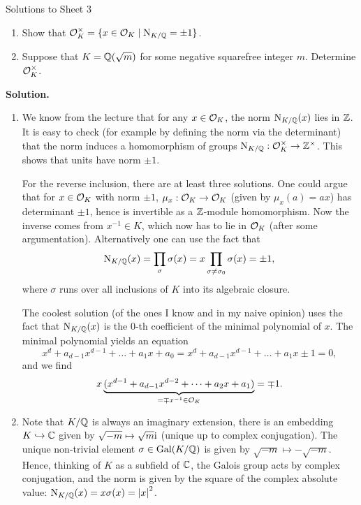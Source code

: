 \documentclass[a4paper,11pt]{article}
\begin{document}
\begin{center}
    \huge{Solutions to Sheet 3}
\end{center}

\begin{enumerate}
    \item Show that $\mathcal{O}_K^\times = \{x \in \mathcal{O}_K \mid \operatorname{N}_{K/\mathbb{Q}} = \pm 1\}$.
    \item Suppose that $K = \mathbb{Q}(\sqrt m)$ for some negative squarefree integer
        $m$. Determine $\mathcal{O}_K^\times$. 
\end{enumerate}

\textbf{Solution.}
\begin{enumerate}[wide, labelindent=0pt]
    \item We know from the lecture that for any $x \in \mathcal{O}_K$, the norm
        $\operatorname{N}_{K/\mathbb{Q}}(x)$ lies in $\mathbb{Z}$. It is easy to check (for example by 
        defining the norm via the determinant) that the norm induces a
        homomorphism of groups $\operatorname{N}_{K/\mathbb{Q}}: \mathcal{O}_K^\times \to \mathbb{Z}^\times$.
        This shows that units have norm $\pm 1$. 

        For the reverse inclusion, there are at least three solutions. 
        One could argue that for $x \in \mathcal{O}_K$ with norm $\pm 1$, $\mu_x: \mathcal{O}_K
        \to \mathcal{O}_K$ (given by $\mu_x(a) = ax$) has determinant $\pm 1$, hence is
        invertible as a $\mathbb{Z}$-module homomorphism. Now the inverse comes from
        $x^{-1} \in K$, which now has to lie in $\mathcal{O}_K$ (after some
        argumentation). Alternatively one can use the fact that $$\operatorname{N}_{K/\mathbb{Q}}(x) =
        \prod_\sigma \sigma(x) = x \prod_{\sigma \neq \sigma_0} \sigma(x) = \pm
        1,$$ where $\sigma$ runs over all inclusions of $K$ into its algebraic
        closure. 

        The coolest solution (of the ones I know and in my naive opinion) uses the fact that
        $\operatorname{N}_{K/\mathbb{Q}}(x)$ is the $0$-th coefficient of the minimal polynomial of
        $x$. The minimal polynomial yields an equation
        \begin{equation*}
            x^d + a_{d-1}x^{d-1} + \dots + a_1 x + a_0 = x^d + a_{d-1}x^{d-1} + \dots + a_1 x \pm 1 = 0,
        \end{equation*}
        and we find
        \begin{equation*}
            x\underbrace{(x^{d-1} + a_{d-1}x^{d-2} + \dots + a_2 x + a_1)}_{= \mp x^{-1} \in \mathcal{O}_K} = \mp 1.
        \end{equation*}
    \item 
        Note that $K/\mathbb{Q}$ is always an imaginary extension, there is an
        embedding $K \hookrightarrow \mathbb{C}$ given by 
        $\sqrt{-m} \mapsto \sqrt m \mathrm i$ (unique up to complex conjugation). 
        The unique non-trivial element $\sigma \in \operatorname{Gal}(K/\mathbb{Q})$ is given by
        $\sqrt{-m} \mapsto - \sqrt{-m}$. 
        Hence, thinking of $K$ as a subfield of $\mathbb{C}$, the Galois group acts by
        complex conjugation, and the norm is given by the square of the complex
        absolute value: $\operatorname{N}_{K/\mathbb{Q}}(x) = x\sigma(x) = \left\lvert x \right\rvert^2$. 


\end{enumerate}
\end{document}

